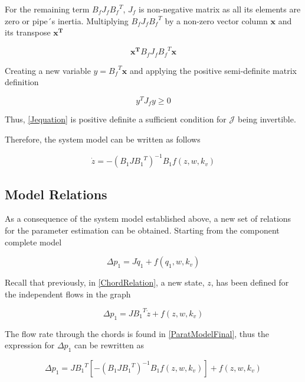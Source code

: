 For the remaining term $B_f J_f {B_f}^T$, $J_f$ is non-negative matrix as all its elements are zero or pipe´s inertia. 
Multiplying $B_f J_f {B_f}^T$ by a non-zero vector column $\mathbf{x}$ and its transpose $\mathbf{x^{T}}$

\begin{equation}
  \mathbf{x^{T}} B_f J_f {B_f}^T \mathbf{x}
  \label{PosDefi}
\end{equation}

Creating a new variable $y = {B_f}^T \mathbf{x}$ and applying the positive semi-definite matrix definition 
\cite{MatrixBook}

\begin{equation}
  y^{T} J_f y \geqslant 0
  \label{PosDefEq}
\end{equation}

Thus, \eqref{Jequation} is positive definite a sufficient condition for $\mathcal{J}$ being invertible. 

Therefore, the system model can be written as follows

\begin{equation}
   \dot{z}  = - (B_1 J {B_1}^T)^{-1}B_1 f(z, w, k_v)
   \label{ParatModelFinal}
 \end{equation}

\subsection{Model Relations}
\label{ModelRelationSection}

As a consequence of the system model established above, a new set of relations for the parameter estimation can be 
obtained. Starting from the component complete model

\begin{equation}
  \Delta p_1 =  J \dot{q}_1 + f(q_1, w, k_v)
  \label{RecallModel}
\end{equation}

Recall that previously, in \eqref{ChordRelation}, a new state, $z$, has been defined for the independent flows in 
the graph

\begin{equation}
  \Delta p_1 =  J {B_1}^T \dot{z} + f(z, w, k_v)
 \end{equation}

The flow rate through the chords is found in \eqref{ParatModelFinal}, thus the expression for $ \Delta p_1 $ can be rewritten as

\begin{equation}
  \Delta p_1 =  J {B_1}^T [- (B_1 J {B_1}^T)^{-1}B_1 f(z, w, k_v)] + f(z, w, k_v)
  \label{PressureLarge}
 \end{equation}
 
